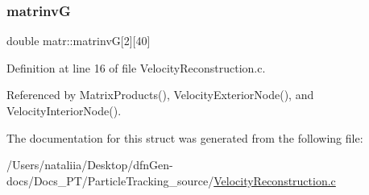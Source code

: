 \subsubsection{\texorpdfstring{matrinvG}{matrinvG}}
{\footnotesize\ttfamily double matr\+::matrinvG\mbox{[}2\mbox{]}\mbox{[}40\mbox{]}}



Definition at line 16 of file Velocity\+Reconstruction.\+c.



Referenced by Matrix\+Products(), Velocity\+Exterior\+Node(), and Velocity\+Interior\+Node().



The documentation for this struct was generated from the following file\+:\begin{DoxyCompactItemize}
\item 
/\+Users/nataliia/\+Desktop/dfn\+Gen-\/docs/\+Docs\+\_\+\+P\+T/\+Particle\+Tracking\+\_\+source/\mbox{\hyperlink{_velocity_reconstruction_8c}{Velocity\+Reconstruction.\+c}}\end{DoxyCompactItemize}

